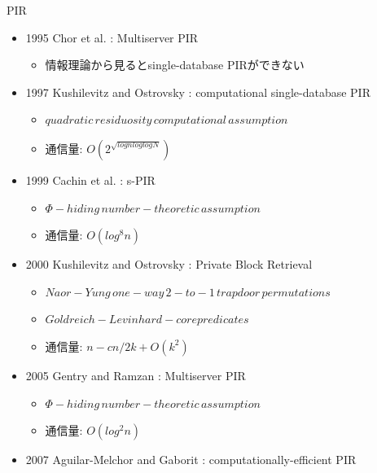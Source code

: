 \documentclass[14pt,xcolor=dvipsnames,table,dvipdfmx]{beamer}
\begin{document}
\begin{frame}[t,allowframebreaks]{PIR}
\fontsize{12pt}{7.2}\selectfont
	\begin{block}{}
		\begin{itemize}
			\item 1995 Chor et al. : Multiserver PIR             
			\begin{itemize}
				\item 情報理論から見るとsingle-database PIRができない              
			\end{itemize}
			\item 1997 Kushilevitz and Ostrovsky : computational single-database PIR             
			\begin{itemize}
				\item $quadratic \, residuosity \, computational \, assumption$
				\item  通信量: $O(2^{\sqrt{lognloglogN}})$             
			\end{itemize}
			\item 1999 Cachin et al. : s-PIR            
			\begin{itemize}
				\item $\Phi-hiding \, number-theoretic \, assumption$
				\item  通信量: $O(log^8n)$ 
			\end{itemize}
			\item 2000 Kushilevitz and Ostrovsky : Private Block Retrieval             
			\begin{itemize}
				\item $Naor-Yung \, one-way \, 2-to-1 \, trapdoor \, permutations$
              			\item $Goldreich-Levin hard-core predicates$
				\item  通信量: $n-cn/2k + O(k^2)$ 
			\end{itemize}
		\end{itemize}
	\end{block}
	\begin{block}{}
		\begin{itemize}
			\item 2005 Gentry and Ramzan : Multiserver PIR             
			\begin{itemize}
				\item $\Phi-hiding \, number-theoretic \, assumption$     
				\item  通信量: $O(log^2n)$         
			\end{itemize}
			\item 2007 Aguilar-Melchor and Gaborit : computationally-efficient PIR             

\end{itemize}
\end{block}
\end{frame}
\end{document}

